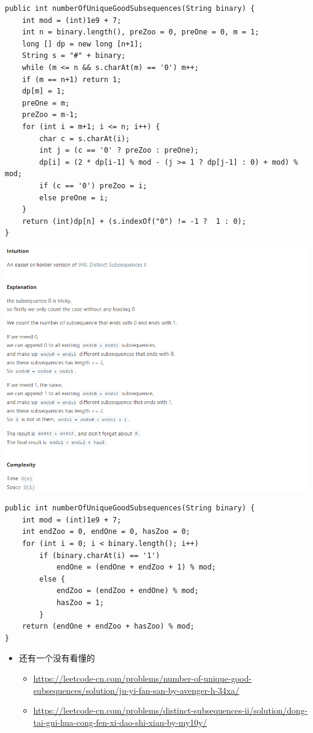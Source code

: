 \documentclass[9pt, b5paaper]{book}
\begin{document}
\begin{verbatim}
public int numberOfUniqueGoodSubsequences(String binary) {
    int mod = (int)1e9 + 7;
    int n = binary.length(), preZoo = 0, preOne = 0, m = 1;
    long [] dp = new long [n+1];
    String s = "#" + binary;
    while (m <= n && s.charAt(m) == '0') m++;
    if (m == n+1) return 1;
    dp[m] = 1;
    preOne = m;
    preZoo = m-1;
    for (int i = m+1; i <= n; i++) {
        char c = s.charAt(i);
        int j = (c == '0' ? preZoo : preOne);
        dp[i] = (2 * dp[i-1] % mod - (j >= 1 ? dp[j-1] : 0) + mod) % mod;
        if (c == '0') preZoo = i;
        else preOne = i;
    }
    return (int)dp[n] + (s.indexOf("0") != -1 ?  1 : 0);
}
\end{verbatim}
\includegraphics[width=.9\linewidth]{./pic/distinctSubsequence.png}
\begin{verbatim}
public int numberOfUniqueGoodSubsequences(String binary) {
    int mod = (int)1e9 + 7;
    int endZoo = 0, endOne = 0, hasZoo = 0;
    for (int i = 0; i < binary.length(); i++) 
        if (binary.charAt(i) == '1')
            endOne = (endOne + endZoo + 1) % mod;
        else {
            endZoo = (endZoo + endOne) % mod;
            hasZoo = 1;
        }
    return (endOne + endZoo + hasZoo) % mod;
}
\end{verbatim}
\begin{itemize}
\item 还有一个没有看懂的
\begin{itemize}
\item \url{https://leetcode-cn.com/problems/number-of-unique-good-subsequences/solution/ju-yi-fan-san-by-avenger-h-34xa/}
\item \url{https://leetcode-cn.com/problems/distinct-subsequences-ii/solution/dong-tai-gui-hua-cong-fen-xi-dao-shi-xian-by-my10y/}
\end{itemize}
\end{itemize}
\end{document}
